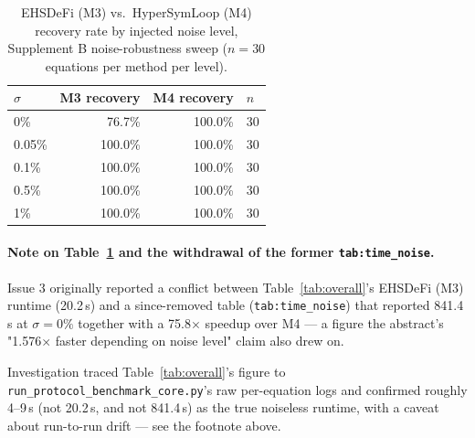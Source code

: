 \begin{table}[H]
\centering
\caption{EHSDeFi (M3) vs.\ HyperSymLoop (M4) recovery rate by injected
  noise level, Supplement B noise-robustness sweep ($n=30$ equations
  per method per level).}
\label{tab:noise_recovery}
\small
\begin{tabular}{lrrl}
\toprule
$\sigma$ & \textcolor{m3blue}{M3 recovery} & \textcolor{m4red}{M4 recovery} & $n$\\
\midrule
0\%    &  76.7\% & 100.0\% & 30\\
0.05\% & 100.0\% & 100.0\% & 30\\
0.1\%  & 100.0\% & 100.0\% & 30\\
0.5\%  & 100.0\% & 100.0\% & 30\\
1\%    & 100.0\% & 100.0\% & 30\\
\bottomrule
\end{tabular}
\end{table}

\paragraph{Note on Table~\ref{tab:noise_recovery} and the withdrawal of the
former \texttt{tab:time\_noise}.}
Issue 3 originally reported a conflict between Table~\ref{tab:overall}'s
EHSDeFi (M3) runtime (20.2\,s) and a since-removed table (\texttt{tab:time\_noise})
that reported 841.4\,s at $\sigma=0\%$ together with a 75.8$\times$ speedup
over M4 — a figure the abstract's "1.576$\times$ faster depending on noise
level" claim also drew on.

Investigation traced Table~\ref{tab:overall}'s figure to
\texttt{run\_protocol\_benchmark\_core.py}'s raw per-equation logs and
confirmed roughly 4--9\,s (not 20.2\,s, and not 841.4\,s) as the true
noiseless runtime, with a caveat about run-to-run drift — see the footnote
above.

